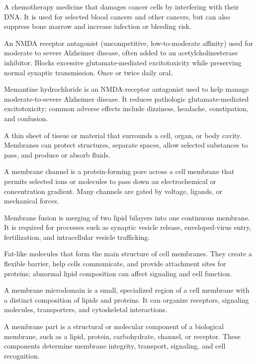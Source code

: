  A chemotherapy medicine that damages cancer cells by interfering with their DNA. It is used for selected blood cancers and other cancers, but can also suppress bone marrow and increase infection or bleeding risk.

 An NMDA receptor antagonist (uncompetitive, low-to-moderate affinity) used for moderate
to severe Alzheimer disease, often added to an acetylcholinesterase inhibitor. Blocks
excessive glutamate-mediated excitotoxicity while preserving normal synaptic
transmission. Once or twice daily oral.

 Memantine hydrochloride is an NMDA-receptor antagonist used to help manage moderate-to-severe Alzheimer disease. It reduces pathologic glutamate-mediated excitotoxicity; common adverse effects include dizziness, headache, constipation, and confusion.

 A thin sheet of tissue or material that surrounds a cell, organ, or body cavity. Membranes can protect structures, separate spaces, allow selected substances to pass, and produce or absorb fluids.

 A membrane channel is a protein-forming pore across a cell membrane that permits selected ions or molecules to pass down an electrochemical or concentration gradient. Many channels are gated by voltage, ligands, or mechanical forces.

 Membrane fusion is merging of two lipid bilayers into one continuous membrane. It is required for processes such as synaptic vesicle release, enveloped-virus entry, fertilization, and intracellular vesicle trafficking.

 Fat-like molecules that form the main structure of cell membranes. They create a flexible barrier, help cells communicate, and provide attachment sites for proteins; abnormal lipid composition can affect signaling and cell function.

 A membrane microdomain is a small, specialized region of a cell membrane with a distinct composition of lipids and proteins. It can organize receptors, signaling molecules, transporters, and cytoskeletal interactions.

 A membrane part is a structural or molecular component of a biological membrane, such as a lipid, protein, carbohydrate, channel, or receptor. These components determine membrane integrity, transport, signaling, and cell recognition.

